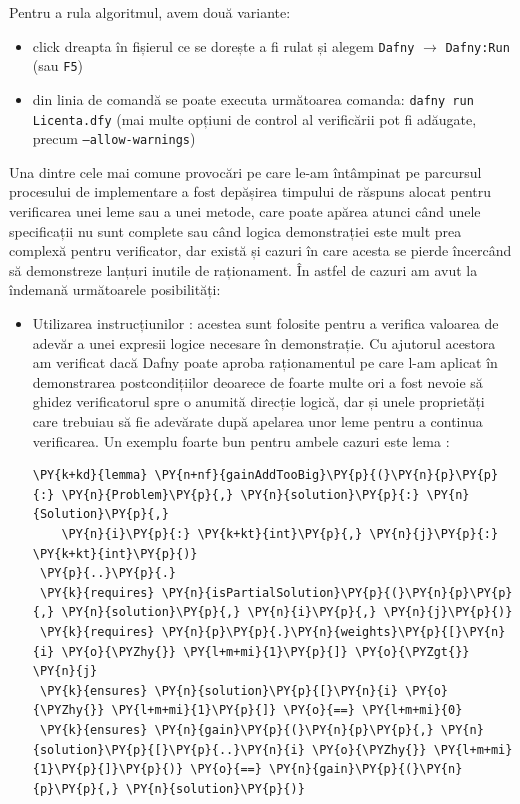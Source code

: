\begin{sloppypar}
 Pentru a rula algoritmul, avem două variante:
 \begin{itemize}
     \item click dreapta în fișierul ce se dorește a fi rulat și alegem \texttt{Dafny} $\rightarrow$ \texttt{Dafny:Run} (sau \texttt{F5})
     \item din linia de comandă se poate executa următoarea comanda: \texttt{dafny run Licenta.dfy} (mai multe opțiuni de control al verificării pot fi adăugate, precum \texttt{--allow-warnings})
 \end{itemize}
 \par
Una dintre cele mai comune provocări pe care le-am întâmpinat pe parcursul procesului de implementare a fost depășirea timpului de răspuns alocat pentru verificarea unei leme sau a unei metode, care poate apărea atunci când unele specificații nu sunt complete sau când logica demonstrației este mult prea complexă pentru verificator, dar există și cazuri în care acesta se pierde încercând să demonstreze lanțuri inutile de raționament. În astfel de cazuri am avut la îndemană următoarele posibilități:
\begin{itemize}
    \item Utilizarea instrucțiunilor : acestea sunt folosite pentru a verifica valoarea de adevăr a unei expresii logice necesare în demonstrație. Cu ajutorul acestora am verificat dacă Dafny poate aproba raționamentul pe care l-am aplicat în demonstrarea postcondițiilor deoarece de foarte multe ori a fost nevoie să ghidez verificatorul spre o anumită direcție logică, dar și unele proprietăți care trebuiau să fie adevărate după apelarea unor leme pentru a continua verificarea. Un exemplu foarte bun pentru ambele cazuri este lema :
   \begin{Verbatim}[commandchars=\\\{\}]
\PY{k+kd}{lemma} \PY{n+nf}{gainAddTooBig}\PY{p}{(}\PY{n}{p}\PY{p}{:} \PY{n}{Problem}\PY{p}{,} \PY{n}{solution}\PY{p}{:} \PY{n}{Solution}\PY{p}{,} 
    \PY{n}{i}\PY{p}{:} \PY{k+kt}{int}\PY{p}{,} \PY{n}{j}\PY{p}{:} \PY{k+kt}{int}\PY{p}{)} 
 \PY{p}{..}\PY{p}{.}
 \PY{k}{requires} \PY{n}{isPartialSolution}\PY{p}{(}\PY{n}{p}\PY{p}{,} \PY{n}{solution}\PY{p}{,} \PY{n}{i}\PY{p}{,} \PY{n}{j}\PY{p}{)}
 \PY{k}{requires} \PY{n}{p}\PY{p}{.}\PY{n}{weights}\PY{p}{[}\PY{n}{i} \PY{o}{\PYZhy{}} \PY{l+m+mi}{1}\PY{p}{]} \PY{o}{\PYZgt{}} \PY{n}{j}
 \PY{k}{ensures} \PY{n}{solution}\PY{p}{[}\PY{n}{i} \PY{o}{\PYZhy{}} \PY{l+m+mi}{1}\PY{p}{]} \PY{o}{==} \PY{l+m+mi}{0}
 \PY{k}{ensures} \PY{n}{gain}\PY{p}{(}\PY{n}{p}\PY{p}{,} \PY{n}{solution}\PY{p}{[}\PY{p}{..}\PY{n}{i} \PY{o}{\PYZhy{}} \PY{l+m+mi}{1}\PY{p}{]}\PY{p}{)} \PY{o}{==} \PY{n}{gain}\PY{p}{(}\PY{n}{p}\PY{p}{,} \PY{n}{solution}\PY{p}{)}

\end{Verbatim}
\end{itemize}
\end{sloppypar}
